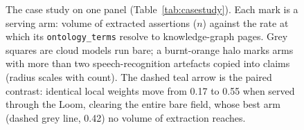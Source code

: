 \begin{figure}[t]
\caption{The case study on one panel (Table~\ref{tab:casestudy}). Each mark is a serving arm:
volume of extracted assertions ($n$) against the rate at which its \texttt{ontology\_terms}
resolve to knowledge-graph pages. Grey squares are cloud models run bare; a burnt-orange halo
marks arms with more than two speech-recognition artefacts copied into claims (radius scales
with count). The dashed teal arrow is the paired contrast: identical local weights move from
0.17 to 0.55 when served through the Loom, clearing the entire bare field, whose best arm
(dashed grey line, 0.42) no volume of extraction reaches.}
\label{fig:casestudy}
\end{figure}

